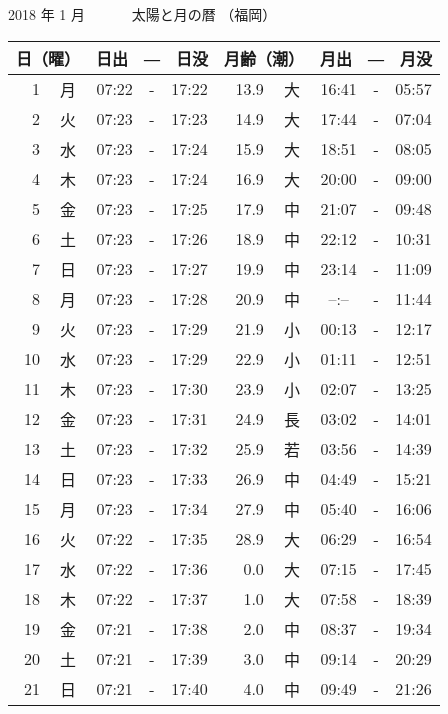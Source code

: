 \documentclass[a4j,10pt]{jsarticle}
\begin{document}
\pagestyle{empty}
\begin{center}
  {\large 2018 年  1 月}
  {\Large 　　　太陽と月の暦   （福岡） }
  \begin{table}[ht]
  \begin{center}
     \begin{tabular}{|rc|ccc|rc|ccc|}
     \hline
     \multicolumn{2}{|c|}{日（曜）} & \multicolumn{3}{c|}{日出　―　日没} & \multicolumn{2}{c|}{月齢（潮）} & \multicolumn{3}{c|}{月出　―　月没}\\
     \hline
  1 & 月 & 07:22 &-& 17:22 & 13.9 & 大 & 16:41 &-& 05:57 \\
  2 & 火 & 07:23 &-& 17:23 & 14.9 & 大 & 17:44 &-& 07:04 \\
  3 & 水 & 07:23 &-& 17:24 & 15.9 & 大 & 18:51 &-& 08:05 \\
  4 & 木 & 07:23 &-& 17:24 & 16.9 & 大 & 20:00 &-& 09:00 \\
  5 & 金 & 07:23 &-& 17:25 & 17.9 & 中 & 21:07 &-& 09:48 \\
  6 & 土 & 07:23 &-& 17:26 & 18.9 & 中 & 22:12 &-& 10:31 \\
  7 & 日 & 07:23 &-& 17:27 & 19.9 & 中 & 23:14 &-& 11:09 \\
  8 & 月 & 07:23 &-& 17:28 & 20.9 & 中 &  --:--  &-& 11:44 \\
  9 & 火 & 07:23 &-& 17:29 & 21.9 & 小 & 00:13 &-& 12:17 \\
 10 & 水 & 07:23 &-& 17:29 & 22.9 & 小 & 01:11 &-& 12:51 \\
 11 & 木 & 07:23 &-& 17:30 & 23.9 & 小 & 02:07 &-& 13:25 \\
 12 & 金 & 07:23 &-& 17:31 & 24.9 & 長 & 03:02 &-& 14:01 \\
 13 & 土 & 07:23 &-& 17:32 & 25.9 & 若 & 03:56 &-& 14:39 \\
 14 & 日 & 07:23 &-& 17:33 & 26.9 & 中 & 04:49 &-& 15:21 \\
 15 & 月 & 07:23 &-& 17:34 & 27.9 & 中 & 05:40 &-& 16:06 \\
 16 & 火 & 07:22 &-& 17:35 & 28.9 & 大 & 06:29 &-& 16:54 \\
 17 & 水 & 07:22 &-& 17:36 &  0.0 & 大 & 07:15 &-& 17:45 \\
 18 & 木 & 07:22 &-& 17:37 &  1.0 & 大 & 07:58 &-& 18:39 \\
 19 & 金 & 07:21 &-& 17:38 &  2.0 & 中 & 08:37 &-& 19:34 \\
 20 & 土 & 07:21 &-& 17:39 &  3.0 & 中 & 09:14 &-& 20:29 \\
 21 & 日 & 07:21 &-& 17:40 &  4.0 & 中 & 09:49 &-& 21:26 \\

\end{tabular}
\end{center}
\end{table}
\end{center}
\end{document}
